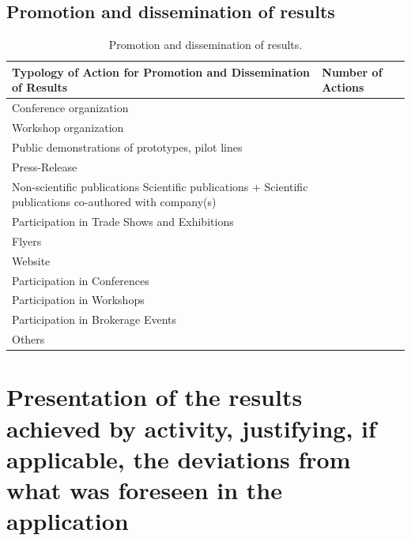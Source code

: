 \documentclass{ani-final}
\begin{document}
  \section{Promotion and dissemination of results}
  \lipsum[20-24]
  
  \begin{table}[!htp]
    \begin{tabular}{|p{}|p{}|}
      \hline
      \textbf{Typology of Action for Promotion and Dissemination of Results} & \textbf{Number of Actions} \\ \hline
      Conference organization                                          &  \\ \hline
      Workshop organization                                            &  \\ \hline
      Public demonstrations of prototypes, pilot lines                 &  \\ \hline
      Press-Release                                                    &  \\ \hline
      Non-scientific publications Scientific publications + Scientific publications co-authored with company(s) &  \\ \hline
      Participation in Trade Shows and Exhibitions                     &  \\ \hline
      Flyers                                                           &  \\ \hline
      Website                                                          &  \\ \hline
      Participation in Conferences                                     &  \\ \hline
      Participation in Workshops                                       &  \\ \hline
      Participation in Brokerage Events                                &  \\ \hline
      Others                                                           &  \\ \hline
    \end{tabular}
    \caption{Promotion and dissemination of results.}
  \end{table}


\chapter{Presentation of the results achieved by activity, justifying, if applicable, the deviations from what was foreseen in the application}
\lipsum[25-30]
\end{document}
